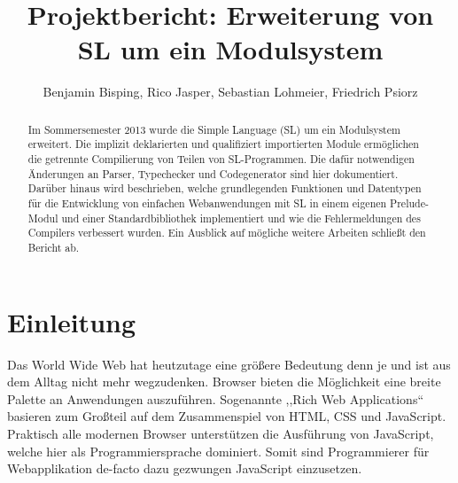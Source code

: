 \documentclass[runningheads]{llncs}
\author{Benjamin Bisping, Rico Jasper, Sebastian Lohmeier,
	Friedrich Psiorz}
\title{Projektbericht: \textbf{Erweiterung von SL um ein Modulsystem}}
\institute{Compilerbauprojekt SoSe 2013\\Technische Universität Berlin}
\begin{document}
\def\open{\texttt{(}}
\def\close{\texttt{)}}
\def\bropen{\texttt{\{}}
\def\brclose{\texttt{\}}}
\def\sqopen{\texttt{[}}
\def\sqclose{\texttt{]}}
\def\squote{\texttt{'}}
\def\dquote{\texttt{''}}
\def\eq{\texttt{=}}
\def\colon{\texttt{:}}
\def\lam{\mbox{\texttt{\BackslashTT}}}
\def\bar{\texttt{|}}
\def\comma{\texttt{,}}
\def\arrow{\texttt{->}}

\def\addint{\texttt{+}}
\def\subint{\texttt{-}}
\def\mulint{\texttt{*}}
\def\divint{\texttt{/}}

\def\ltint{\texttt{<}}
\def\leint{\texttt{<=}}
\def\eqint{\texttt{==}}
\def\neint{\texttt{/=}}
\def\geint{\texttt{>=}}
\def\gtint{\texttt{>}}

\def\exclamationOp{\texttt{!}}
\def\paragraphOp{\texttt{§}}
\def\percentOp{\texttt{\%}}
\def\ampOp{\texttt{\&}}
\def\questionOp{\texttt{?}}
\def\sharpOp{\texttt{\#}}
\def\pipeOp{\texttt{|}}

\maketitle

\begin{abstract}
Im Sommersemester 2013 wurde die Simple Language (SL) um ein
Modulsystem erweitert. Die implizit deklarierten und qualifiziert
importierten Module ermöglichen die getrennte Compilierung von Teilen
von SL-Programmen. Die dafür notwendigen Änderungen an Parser,
Typechecker und Codegenerator sind hier dokumentiert. Darüber hinaus
wird beschrieben, welche grundlegenden Funktionen und Datentypen für
die Entwicklung von einfachen Webanwendungen mit SL in einem eigenen
Prelude-Modul und einer Standardbibliothek implementiert und
wie die Fehlermeldungen des Compilers verbessert wurden. Ein Ausblick
auf mögliche weitere Arbeiten schließt den Bericht ab.
\end{abstract}

\tableofcontents
\vfill

\section{Einleitung}

Das World Wide Web hat heutzutage eine größere Bedeutung denn je und ist aus dem Alltag nicht mehr wegzudenken. Browser bieten die Möglichkeit eine breite Palette an Anwendungen auszuführen. Sogenannte ,,Rich Web Applications`` basieren zum Großteil auf dem Zusammenspiel von HTML, CSS und JavaScript. Praktisch alle modernen Browser unterstützen die Ausführung von JavaScript, welche hier als Programmiersprache dominiert. Somit sind Programmierer für Webapplikation de-facto dazu gezwungen JavaScript einzusetzen.
\end{document}
